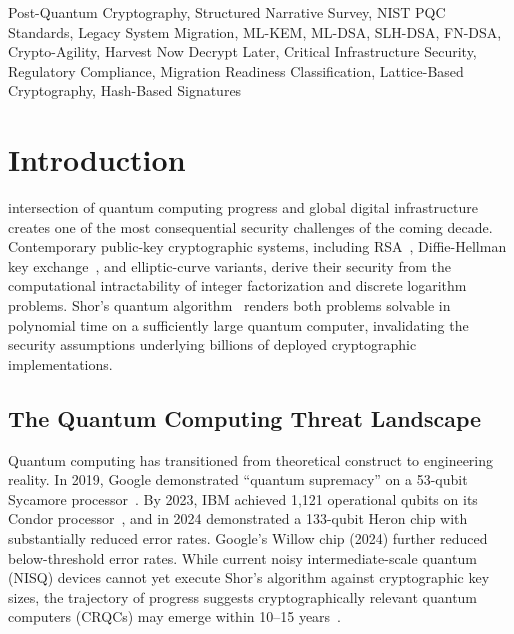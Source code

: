 \documentclass[journal]{IEEEtran}
\begin{document}
\begin{abstract}
This survey provides researchers, practitioners, and policymakers with a
structured roadmap for evidence-based PQC migration decision-making, supported
by reproducible analysis code and a curated dataset.
\end{abstract}

\begin{IEEEkeywords}
Post-Quantum Cryptography, Structured Narrative Survey, NIST PQC Standards,
Legacy System Migration, ML-KEM, ML-DSA, SLH-DSA, FN-DSA, Crypto-Agility,
Harvest Now Decrypt Later, Critical Infrastructure Security, Regulatory Compliance,
Migration Readiness Classification, Lattice-Based Cryptography, Hash-Based Signatures
\end{IEEEkeywords}

\FloatBarrier
\section{Introduction}
\label{sec:intro}

 intersection of quantum computing progress and global digital
infrastructure creates one of the most consequential security challenges of the
coming decade. Contemporary public-key cryptographic systems, including RSA~\cite{rivest1978method},
Diffie-Hellman key exchange~\cite{diffie1976new}, and elliptic-curve variants, derive
their security from the computational intractability of integer factorization and
discrete logarithm problems. Shor's quantum algorithm~\cite{shor1994algorithms}
renders both problems solvable in polynomial time on a sufficiently large
quantum computer, invalidating the security assumptions underlying billions of
deployed cryptographic implementations.

\subsection{The Quantum Computing Threat Landscape}

Quantum computing has transitioned from theoretical construct to engineering
reality. In 2019, Google demonstrated ``quantum supremacy'' on a 53-qubit
Sycamore processor~\cite{arute2019quantum}. By 2023, IBM achieved 1,121
operational qubits on its Condor processor~\cite{ibm2023condor}, and in 2024
demonstrated a 133-qubit Heron chip with substantially reduced error rates.
Google's Willow chip (2024) further reduced below-threshold error rates.
While current noisy intermediate-scale quantum (NISQ) devices cannot yet
execute Shor's algorithm against cryptographic key sizes, the trajectory of
progress suggests cryptographically relevant quantum computers (CRQCs) may
emerge within 10--15 years~\cite{mosca2018cybersecurity,preskill2018quantum}.
\end{document}
